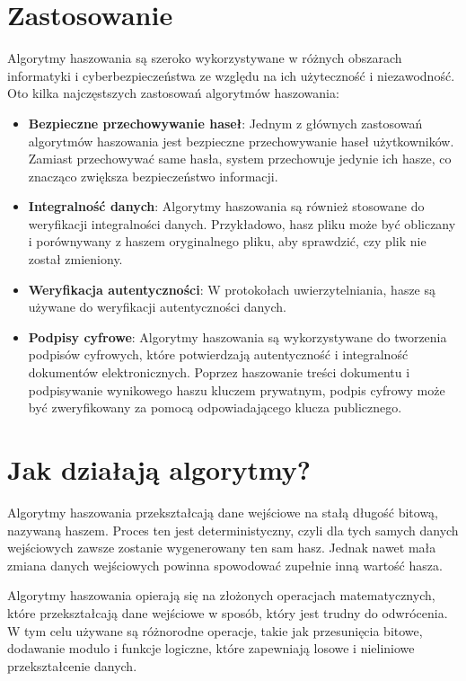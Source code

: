 \documentclass{article}
\begin{document}
\begin{enumerate}
\end{enumerate}

\section{Zastosowanie}
    Algorytmy haszowania są szeroko wykorzystywane w różnych obszarach informatyki i cyberbezpieczeństwa ze względu na ich użyteczność i niezawodność. Oto kilka najczęstszych zastosowań algorytmów haszowania:

\begin{itemize}
    \item \textbf{Bezpieczne przechowywanie haseł}: Jednym z głównych zastosowań algorytmów haszowania jest bezpieczne przechowywanie haseł użytkowników. Zamiast przechowywać same hasła, system przechowuje jedynie ich hasze, co znacząco zwiększa bezpieczeństwo informacji. 
    
    \item \textbf{Integralność danych}: Algorytmy haszowania są również stosowane do weryfikacji integralności danych. Przykładowo, hasz pliku może być obliczany i porównywany z haszem oryginalnego pliku, aby sprawdzić, czy plik nie został zmieniony.
    
    \item \textbf{Weryfikacja autentyczności}: W protokołach uwierzytelniania, hasze są używane do weryfikacji autentyczności danych.
    
    \item \textbf{Podpisy cyfrowe}: Algorytmy haszowania są wykorzystywane do tworzenia podpisów cyfrowych, które potwierdzają autentyczność i integralność dokumentów elektronicznych. Poprzez haszowanie treści dokumentu i podpisywanie wynikowego haszu kluczem prywatnym, podpis cyfrowy może być zweryfikowany za pomocą odpowiadającego klucza publicznego.
\end{itemize}

\section{Jak działają algorytmy?}
    Algorytmy haszowania przekształcają dane wejściowe na stałą długość bitową, nazywaną haszem. Proces ten jest deterministyczny, czyli dla tych samych danych wejściowych zawsze zostanie wygenerowany ten sam hasz. Jednak nawet mała zmiana danych wejściowych powinna spowodować zupełnie inną wartość hasza.

    Algorytmy haszowania opierają się na złożonych operacjach matematycznych, które przekształcają dane wejściowe w sposób, który jest trudny do odwrócenia. W tym celu używane są różnorodne operacje, takie jak przesunięcia bitowe, dodawanie modulo i funkcje logiczne, które zapewniają losowe i nieliniowe przekształcenie danych.
\end{document}
